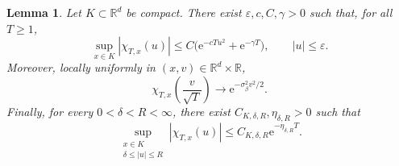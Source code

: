 \documentclass[11pt,reqno]{amsart}
\newtheorem{lemma}[theorem]{Lemma}
\theoremstyle{definition}
\numberwithin{equation}{section}
\newcommand{\<}{\langle}
\renewcommand{\>}{\rangle}
\begin{document}
\begin{lemma}
\label{lem:fourier-estimates}
Let $K\subset\mathbb R^d$ be compact.  There exist
$\varepsilon,c,C,\gamma>0$ such that, for all $T\geq1$,
\begin{equation}
 \sup_{x\in K}|\chi_{T,x}(u)|
 \leq C\bigl(\mathrm e^{-cTu^2}+ \mathrm e^{-\gamma T}\bigr),
 \qquad |u|\leq\varepsilon.
 \label{eq:small-frequency-bound}
\end{equation}
Moreover, locally uniformly in $(x,v)\in\mathbb R^d\times\mathbb R$,
\begin{equation}
 \chi_{T,x}\left(\frac v{\sqrt T}\right)
 \longrightarrow \mathrm e^{-\sigma_\beta^2v^2/2}.
 \label{eq:scaled-characteristic-limit}
\end{equation}
Finally, for every $0<\delta<R<\infty$, there exist
$C_{K,\delta,R},\eta_{\delta,R}>0$ such that
\begin{equation}
 \sup_{\substack{x\in K\\\delta\leq|u|\leq R}}
 |\chi_{T,x}(u)|
 \leq C_{K,\delta,R}\mathrm e^{-\eta_{\delta,R}T}.
 \label{eq:annular-characteristic-bound}
\end{equation}
\end{lemma}
\end{document}

